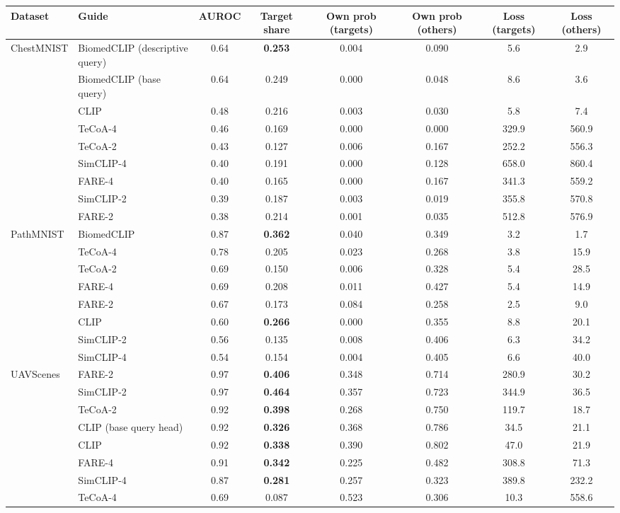\begin{tabular}{llcccccc}
\toprule
Dataset & Guide & AUROC & Target share & Own prob (targets) & Own prob (others) & Loss (targets) & Loss (others) \\
\midrule
\multirow{9}{*}{ChestMNIST} & BiomedCLIP (descriptive query) & 0.64 & \textbf{0.253} & 0.004 & 0.090 & 5.6 & 2.9 \\
 & BiomedCLIP (base query) & 0.64 & 0.249 & 0.000 & 0.048 & 8.6 & 3.6 \\
 & CLIP & 0.48 & 0.216 & 0.003 & 0.030 & 5.8 & 7.4 \\
 & TeCoA-4 & 0.46 & 0.169 & 0.000 & 0.000 & 329.9 & 560.9 \\
 & TeCoA-2 & 0.43 & 0.127 & 0.006 & 0.167 & 252.2 & 556.3 \\
 & SimCLIP-4 & 0.40 & 0.191 & 0.000 & 0.128 & 658.0 & 860.4 \\
 & FARE-4 & 0.40 & 0.165 & 0.000 & 0.167 & 341.3 & 559.2 \\
 & SimCLIP-2 & 0.39 & 0.187 & 0.003 & 0.019 & 355.8 & 570.8 \\
 & FARE-2 & 0.38 & 0.214 & 0.001 & 0.035 & 512.8 & 576.9 \\
\midrule
\multirow{8}{*}{PathMNIST} & BiomedCLIP & 0.87 & \textbf{0.362} & 0.040 & 0.349 & 3.2 & 1.7 \\
 & TeCoA-4 & 0.78 & 0.205 & 0.023 & 0.268 & 3.8 & 15.9 \\
 & TeCoA-2 & 0.69 & 0.150 & 0.006 & 0.328 & 5.4 & 28.5 \\
 & FARE-4 & 0.69 & 0.208 & 0.011 & 0.427 & 5.4 & 14.9 \\
 & FARE-2 & 0.67 & 0.173 & 0.084 & 0.258 & 2.5 & 9.0 \\
 & CLIP & 0.60 & \textbf{0.266} & 0.000 & 0.355 & 8.8 & 20.1 \\
 & SimCLIP-2 & 0.56 & 0.135 & 0.008 & 0.406 & 6.3 & 34.2 \\
 & SimCLIP-4 & 0.54 & 0.154 & 0.004 & 0.405 & 6.6 & 40.0 \\
\midrule
\multirow{8}{*}{UAVScenes} & FARE-2 & 0.97 & \textbf{0.406} & 0.348 & 0.714 & 280.9 & 30.2 \\
 & SimCLIP-2 & 0.97 & \textbf{0.464} & 0.357 & 0.723 & 344.9 & 36.5 \\
 & TeCoA-2 & 0.92 & \textbf{0.398} & 0.268 & 0.750 & 119.7 & 18.7 \\
 & CLIP (base query head) & 0.92 & \textbf{0.326} & 0.368 & 0.786 & 34.5 & 21.1 \\
 & CLIP & 0.92 & \textbf{0.338} & 0.390 & 0.802 & 47.0 & 21.9 \\
 & FARE-4 & 0.91 & \textbf{0.342} & 0.225 & 0.482 & 308.8 & 71.3 \\
 & SimCLIP-4 & 0.87 & \textbf{0.281} & 0.257 & 0.323 & 389.8 & 232.2 \\
 & TeCoA-4 & 0.69 & 0.087 & 0.523 & 0.306 & 10.3 & 558.6 \\
\bottomrule
\end{tabular}

